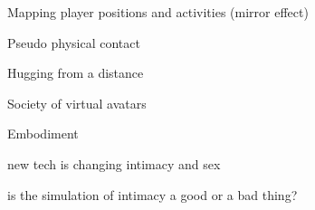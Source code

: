 
Mapping player positions and activities (mirror effect) \cite{Mao2021}

Pseudo physical contact \cite{Kulik2020}

Hugging from a distance \cite{Freeman2021}

Society of virtual avatars \cite{novak2022rise}

Embodiment \cite{moura2021}

new tech is changing intimacy and sex \cite{power2020new}

is the simulation of intimacy a good or a bad thing? \cite{essig2018technology}